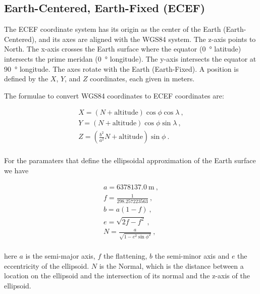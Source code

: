 \subsection{Earth-Centered, Earth-Fixed (ECEF)}

The ECEF coordinate system has its origin as the center of the Earth
(Earth-Centered), and its axes are aligned with the WGS84 system. The
z-axis points to North. The x-axis crosses the Earth surface where the
equator (\SI{0}{\degree} latitude) intersects the prime meridan
(\SI{0}{\degree} longitude). The y-axis intersects the equator at
\SI{90}{\degree} longitude. The axes rotate with the Earth
(Earth-Fixed). A position is defined by the $X$, $Y$, and $Z$
coordinates, each given in meters.

The formulae to convert WGS84 coordinates to ECEF coordinates are:

\begin{equation}
    \begin{array}{l}
        X = \left(N + \mathrm{altitude}\right) \cos{\phi} \cos{\lambda} \ , \\
        Y = \left(N + \mathrm{altitude}\right) \cos{\phi} \sin{\lambda} \ , \\
        Z = \left(\frac{b^2}{a^2} N + \mathrm{altitude}\right) \sin{\phi} \ . \\
    \end{array}
\end{equation}

\noindent
For the paramaters that define the ellipsoidal approximation of the
Earth surface we have

\begin{equation}
    \label{eq:wgs84}
    \begin{array}{l}
        a = \SI{6378137.0}{\meter} \ , \\
        f = \frac{1}{298.257223563} \ , \\
        b = a (1 - f) \ , \\
        e = \sqrt{2 f - f^2} \ , \\
        N = \frac{a}{\sqrt{1 - e^2 \sin{\phi}^2}} \ , \\
    \end{array}
\end{equation}

\noindent here $a$ is the semi-major axis, $f$ the flattening, $b$ the
semi-minor axis and $e$ the eccentricity of the ellipsoid. $N$ is the
Normal, which is the distance between a location on the ellipsoid and
the intersection of its normal and the z-axis of the ellipsoid.



